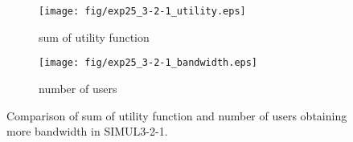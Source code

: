 \begin{figure}
	\begin{center}
		\begin{subfigure}[b]{0.8\textwidth}
			\centering
			\texttt{[image: fig/exp25\_3-2-1\_utility.eps]}
			\caption{sum of utility function}
			\label{figure:simul3_2_1_u_a}
		\end{subfigure}
		\begin{subfigure}[b]{0.8\textwidth}
			\centering
			\texttt{[image: fig/exp25\_3-2-1\_bandwidth.eps]}
			\caption{number of users}
			\label{figure:simul3_2_1_u_b}
		\end{subfigure}
		\caption{Comparison of sum of utility function and number of users obtaining more bandwidth in SIMUL3-2-1.}
		\label{figure:simul3_2_1_u}
	\end{center}
\end{figure}

\clearpage

